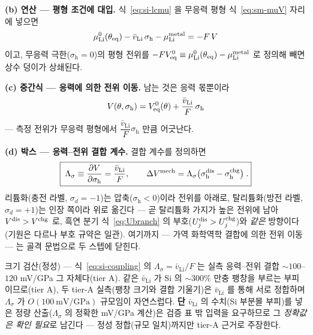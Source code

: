 \textbf{(b) 연산 --- 평형 조건에 대입.} 식~\eqref{eq:si-lcmu} 을 무응력 평형
식~\eqref{eq:sm-muV} 자리에 넣으면
\begin{equation}
\mu_\mathrm{Li}^{0}(\theta_{\mathrm{eq}})-\bar v_\mathrm{Li}\,\sigma_\mathrm{h}-\mu_\mathrm{Li}^\mathrm{metal}=-F\,V
\label{eq:si-lcbal}
\end{equation}
이고, 무응력 극한($\sigma_\mathrm{h}{=}0$)의 평형 전위를
$-FV_{\mathrm{eq}}^{0}\equiv\mu_\mathrm{Li}^{0}(\theta_{\mathrm{eq}})-\mu_\mathrm{Li}^\mathrm{metal}$ 로 정의해 빼면 상수
덩이가 상쇄된다.

\textbf{(c) 중간식 --- 응력에 의한 전위 이동.} 남는 것은 응력 몫뿐이라
\begin{equation}
V(\theta,\sigma_\mathrm{h})=V_{\mathrm{eq}}^{0}(\theta)+\frac{\bar v_\mathrm{Li}}{F}\,\sigma_\mathrm{h}
\label{eq:si-vshift}
\end{equation}
--- 측정 전위가 무응력 평형에서 $\dfrac{\bar v_\mathrm{Li}}{F}\sigma_\mathrm{h}$ 만큼 어긋난다.

\textbf{(d) 박스 --- 응력--전위 결합 계수.} 결합 계수를 정의하면
\begin{equation}
\boxed{\;\Lambda_\sigma\equiv\frac{\partial V}{\partial\sigma_\mathrm{h}}=\frac{\bar v_\mathrm{Li}}{F},
\qquad
\Delta V^\mathrm{mech}=\Lambda_\sigma\bigl(\sigma_\mathrm{h}^{\mathrm{dis}}-\sigma_\mathrm{h}^{\mathrm{chg}}\bigr)\;.}
\label{eq:si-coupling}
\end{equation}
리튬화(충전 라벨, $\sigma_d{=}-1$)는 압축($\sigma_\mathrm{h}<0$)이라 전위를 아래로, 탈리튬화(방전 라벨,
$\sigma_d{=}+1$)는 인장 쪽이라 위로 옮긴다 --- 곧 탈리튬화 가지가 높은 전위에 남아
$V^{\mathrm{dis}}>V^{\mathrm{chg}}$ 로, 흑연 분기 식~\eqref{eq:Ubranch} 의 부호($U_j^{\mathrm{dis}}>U_j^{\mathrm{chg}}$)와 \emph{같은}
방향이다(기원은 다르나 부호 규약은 일관). 여기까지 --- 가역 화학역학 결합에 의한 전위 이동 --- 는 골격
문법으로 두 스텝에 닫힌다.
\begin{verifybox}
크기 검산(정성) --- 식~\eqref{eq:si-coupling} 의 $\Lambda_\sigma=\bar v_\mathrm{Li}/F$ 는 실측
응력--전위 결합 $\sim100$--$120$ mV/GPa 그 자체다(tier A\cite{sethuraman_stresspot2010}). 같은
$\bar v_\mathrm{Li}$ 가 Si 의 $\sim300\%$ 만충 팽창을 부르는 부피이므로(tier A\cite{beaulieu2001}), 두
tier-A 실측(팽창 크기와 결합 기울기)은 $\bar v_\mathrm{Li}$ 를 통해 서로 정합하며 $\Lambda_\sigma$ 가
$O(100\ \mathrm{mV/GPa})$ 규모임이 자연스럽다. \textbf{단} $\bar v_\mathrm{Li}$ 의 수치(Si 부분몰 부피)를
넣은 정량 산출($\Lambda_\sigma$ 의 정확한 mV/GPa 계산)은 검증 표 밖 입력을 요구하므로 그 \emph{정확값은
확인 필요}로 남긴다 --- 정성 정합(규모 일치)까지만 tier-A 근거로 주장한다.
\end{verifybox}

